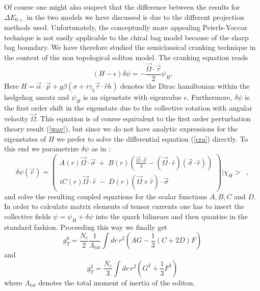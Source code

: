 Of course one might also suspect that the difference between the results
for $\Delta E_{0+}$ in the two models we have discussed is due to the different 
projection methods used. Unfortunately, the conceptually more appealing
Peierls-Yoccoz technique is not easily applicable to the chiral bag model
because of the sharp bag boundary. We have therefore studied the 
semiclassical cranking technique in the context of the non topological 
soliton model. The cranking equation reads \cite{Coh}
\begin{equation}
\label{cra}
(H-\epsilon)\delta\psi=-\frac{\vec{\Omega}\cdot\vec{\tau}}{2}\psi_H .
\end{equation}
Here $H=\vec{\alpha}\cdot\vec{p}+g\beta(\sigma+i\gamma_5\vec{\tau}\cdot
\hat{r}h)$
denotes the Dirac hamiltonian within the  hedgehog ansatz and $\psi_H$ is
an eigenstate with eigenvalue $\epsilon$. Furthermore, $\delta\psi$ is
the first order shift in the eigenstate due to the collective rotation with
angular velocity $\vec{\Omega}$. This equation is of course equivalent to 
the first order perturbation theory result (\ref{wav}), but since we do not
have analytic  expressions for the eigenstates of $H$  we prefer to solve
the differential equation (\ref{cra}) directly. To this end we parametrize
$\delta \psi$ as in \cite{Coh} :
\begin{equation}
\delta\psi(\vec{r}) = \left( 
\begin{array}{c}
 A(r)\vec{\Omega}\cdot\vec{\sigma} \;+\; B(r) (\frac{\vec{\Omega}\cdot
\vec{\sigma}}{3}-(\vec{\Omega}\cdot\hat{r})(\vec{\sigma}\cdot\hat{r})) \\
iC(r)\vec{\Omega}\cdot\hat{r} \;-\; D(r) (\vec{\Omega}\times\hat{r})
\cdot\vec{\sigma}
\end{array}   \right) |\chi_H>\;\;,
\end{equation}
and solve the resulting coupled equations for the scalar functions
$A,B,C$ and $D$. In order to calculate matrix elements of tensor currents 
one has to insert the collective fields $\psi=\psi_H+\delta\psi$ into
the quark bilinears and then quantise in the standard fashion. 
Proceeding this way we finally get
\begin{equation}
 g_T^{0}= \frac{N_c}{2}\frac{1}{\Lambda_{tot}} \int dr\, r^2
 ( AG-\frac{1}{3}(C+2D)F)
\end{equation}
and
\begin{equation}
g_T^{3}=\frac{N_c}{3} \int dr\, r^2 (G^2+\frac{1}{3}F^2)
\end{equation}
where $\Lambda_{tot}$ denotes the total moment of inertia of the 
soliton.

